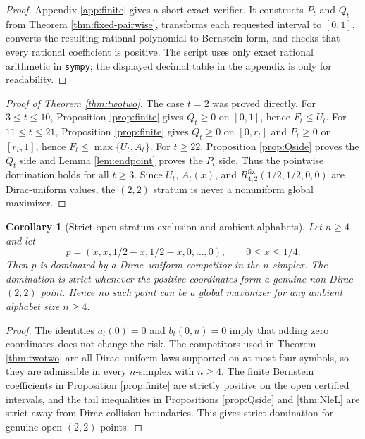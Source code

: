 \documentclass[11pt]{article}
\newtheorem{corollary}[theorem]{Corollary}
\theoremstyle{definition}
\newcommand{\fix}{\mathrm{fix}}
\begin{document}
\begin{proof}
Appendix \ref{app:finite} gives a short exact verifier.  It constructs $P_t$ and $Q_t$ from Theorem \ref{thm:fixed-pairwise}, transforms each requested interval to $[0,1]$, converts the resulting rational polynomial to Bernstein form, and checks that every rational coefficient is positive.  The script uses only exact rational arithmetic in \texttt{sympy}; the displayed decimal table in the appendix is only for readability.
\end{proof}

\begin{proof}[Proof of Theorem \ref{thm:twotwo}]
The case $t=2$ was proved directly.  For $3\le t\le10$, Proposition \ref{prop:finite} gives $Q_t\ge0$ on $[0,1]$, hence $F_t\le U_t$.  For $11\le t\le21$, Proposition \ref{prop:finite} gives $Q_t\ge0$ on $[0,r_t]$ and $P_t\ge0$ on $[r_t,1]$, hence $F_t\le\max\{U_t,A_t\}$.  For $t\ge22$, Proposition \ref{prop:Qside} proves the $Q_t$ side and Lemma \ref{lem:endpoint} proves the $P_t$ side.  Thus the pointwise domination holds for all $t\ge3$.  Since $U_t$, $A_t(x)$, and $R_{4,2}^{\fix}(1/2,1/2,0,0)$ are Dirac-uniform values, the $(2,2)$ stratum is never a nonuniform global maximizer.
\end{proof}


\begin{corollary}[Strict open-stratum exclusion and ambient alphabets]\label{cor:ambient-twotwo}
Let $n\ge4$ and let
\[
  p=(x,x,1/2-x,1/2-x,0,\ldots,0),
  \qquad 0\le x\le1/4.
\]
Then $p$ is dominated by a Dirac--uniform competitor in the $n$-simplex.
The domination is strict whenever the positive coordinates form a genuine
non-Dirac $(2,2)$ point.  Hence no such point can be a global maximizer
for any ambient alphabet size $n\ge4$.
\end{corollary}

\begin{proof}
The identities $a_t(0)=0$ and $b_t(0,u)=0$ imply that adding zero
coordinates does not change the risk.  The competitors used in Theorem
\ref{thm:twotwo} are all Dirac--uniform laws supported on at most four
symbols, so they are admissible in every $n$-simplex with $n\ge4$.  The
finite Bernstein coefficients in Proposition \ref{prop:finite} are
strictly positive on the open certified intervals, and the tail inequalities
in Propositions \ref{prop:Qside} and \ref{thm:NleL} are strict away from
Dirac collision boundaries.  This gives strict domination for genuine
open $(2,2)$ points.
\end{proof}
\end{document}
